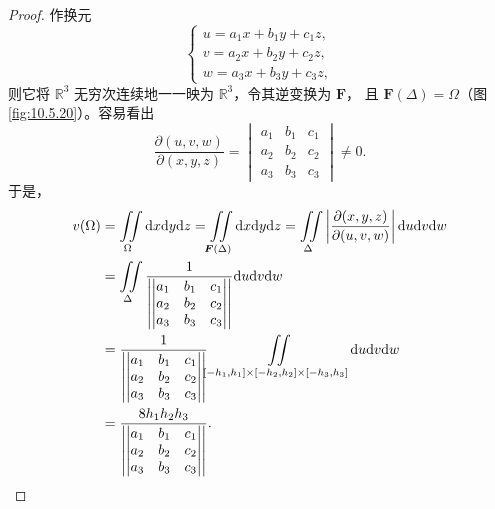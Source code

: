\begin{proof}
作换元
\[
\begin{cases}
u = a_1 x + b_1 y + c_1 z,\\
v = a_2 x + b_2 y + c_2 z,\\
w = a_3 x + b_3 y + c_3 z,
\end{cases}
\]
则它将 $\mathbb{R}^3$ 无穷次连续地一一映为 $\mathbb{R}^3$，令其逆变换为 $\boldsymbol{F}$，
且 $\boldsymbol{F}(\Delta) = \Omega$（图 \ref{fig:10.5.20}）。容易看出
\[
\frac{\partial(u, v, w)}{\partial(x, y, z)} =
\begin{vmatrix}
a_1 & b_1 & c_1\\
a_2 & b_2 & c_2\\
a_3 & b_3 & c_3
\end{vmatrix} \neq 0.
\]
于是，
\begin{align*}
v(\Omega)
&= \iint \limits_{\Omega} \mathrm{d}x \mathrm{d}y \mathrm{d}z
 = \iint \limits_{\boldsymbol{F}(\Delta)} \mathrm{d}x \mathrm{d}y \mathrm{d}z
 = \iint \limits_{\Delta} \left| \frac{\partial(x, y, z)}{\partial(u, v, w)} \right|
   \mathrm{d}u \mathrm{d}v \mathrm{d}w \notag\\
&= \iint \limits_{\Delta} \frac{1}{
   \left| \begin{vmatrix} a_1 & b_1 & c_1\\ a_2 & b_2 & c_2\\ a_3 & b_3 & c_3 \end{vmatrix} \right|}
   \mathrm{d}u \mathrm{d}v \mathrm{d}w \notag\\
&= \frac{1}{
   \left| \begin{vmatrix} a_1 & b_1 & c_1\\ a_2 & b_2 & c_2\\ a_3 & b_3 & c_3 \end{vmatrix} \right|}
   \iint \limits_{[-h_1, h_1] \times [-h_2, h_2] \times [-h_3, h_3]} \mathrm{d}u \mathrm{d}v \mathrm{d}w \notag\\
&= \frac{8 h_1 h_2 h_3}{
   \left| \begin{vmatrix} a_1 & b_1 & c_1\\ a_2 & b_2 & c_2\\ a_3 & b_3 & c_3 \end{vmatrix} \right|}.
\end{align*}
\end{proof}


